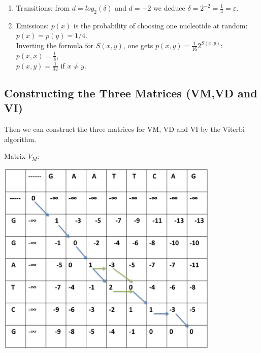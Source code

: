 \documentclass[english, a4paper,11pt]{article}
\begin{document}
\begin{enumerate}
\item Transitions: from $d = log_2(\delta)$ and $d = -2$ we deduce $\delta = 2^{-2} = \frac{1}{4} = \varepsilon$.
\item Emissions: $p(x)$ is the probability of choosing one nucleotide at random: $p(x)=p(y)=1/4$.\\
Inverting the formula for $S(x,y)$, one gets $p(x,y) = \frac{1}{16}2^{S(x,y)}$: \\
$p(x,x) = \frac{1}{8}$,\\
$p(x,y) = \frac{1}{32}$ if $x \neq y$.
\end{enumerate}

\subsection{Constructing the Three Matrices (VM,VD and VI)}

Then we can construct the three matrices for VM, VD and VI by the Viterbi algorithm.

Matrix $V_M$:
\begin{center}
\includegraphics[width=0.8\textwidth]{Slide1.eps}
\end{center}
\end{document}
